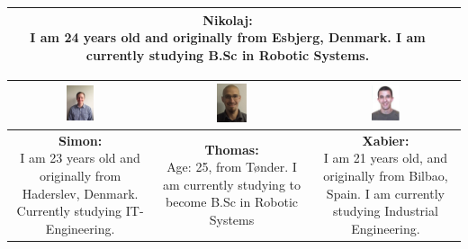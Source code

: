 \begin{table}[h]
\begin{tabular}{|c|c|c|c|}
&

\parbox[t] {0.2\textwidth}{
\textbf{Nikolaj:} \\
I am 24 years old and originally from Esbjerg, Denmark. I am currently studying B.Sc in Robotic Systems.
} 

\\\hline
\end{tabular}

\begin{tabular}{|c|c|c|}
\hline
\includegraphics[width=0.2\textwidth]{graphics/Simon_profile} & %
\includegraphics[width=0.2\textwidth]{graphics/Thomas_profile} & %
\includegraphics[width=0.2\textwidth]{graphics/sexy_xabi_profile} \\ \hline %
\parbox[t] {0.2\textwidth}{
\textbf{Simon:} \\
I am 23 years old and originally from Haderslev, Denmark. Currently studying IT-Engineering.

} 

&

\parbox[t] {0.2\textwidth}{
\textbf{Thomas:} \\
Age: 25, from Tønder. I am currently studying to become B.Sc in Robotic Systems
} 

&

\parbox[t] {0.2\textwidth}{
\textbf{Xabier:} \\
I am 21 years old, and originally from Bilbao, Spain. I am currently studying Industrial Engineering.
} 

\\\hline
\end{tabular}
\end{table}


